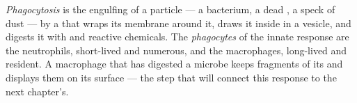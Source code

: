 \begin{definition}[Phagocytosis]\label{def:g12:innate-immunity:phagocytosis}
\emph{Phagocytosis} is the engulfing of a
particle --- a bacterium, a dead , a speck of dust --- by a 
that wraps its membrane around it, draws it inside in a vesicle, and
digests it with  and reactive chemicals. The
\emph{phagocytes} of the innate response are the
neutrophils, short-lived and numerous, and the macrophages, long-lived
and resident. A macrophage that has digested a microbe keeps
fragments of its  and displays them on its surface --- the
step that will connect this response to the next chapter's.
\end{definition}

